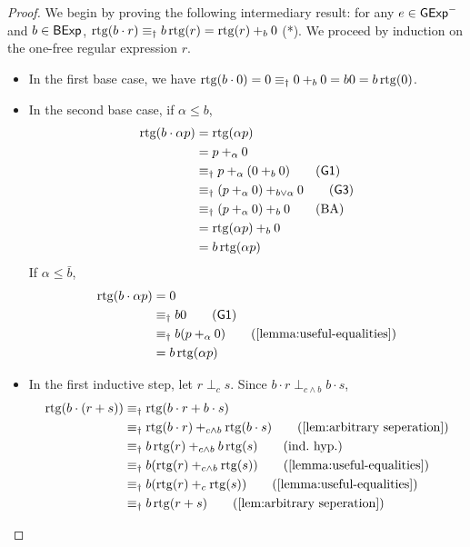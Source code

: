 \documentclass[orivec,envcountsect,envcountsame]{llncs}
\begin{document}
\begin{proof}
	We begin by proving the following intermediary result: for any \(e \in \mathsf{GExp}^-\) and \(b \in \mathsf{BExp}\), \(\operatorname{rtg}(b\cdot r) \equiv_\dagger b\operatorname{rtg}(r) = \operatorname{rtg}(r) +_b 0\) (*).
	We proceed by induction on the one-free regular expression \(r\).
	\begin{itemize}
		\item In the first base case, we have \(\operatorname{rtg}(b\cdot 0) = 0 \equiv_\dagger 0 +_b 0 = b0 = b\operatorname{rtg}(0)\).
		\item In the second base case, if \(\alpha \le b\),
		\begin{align*}
			\rtg(b\cdot \alpha p) &= \rtg(\alpha p)  \\
							&= p +_\alpha 0 \\
							&\equiv_\dagger p +_\alpha (0 +_b 0) \tag{\textsf{G1}}\\
							&\equiv_\dagger (p +_\alpha 0) +_{b \vee \alpha} 0 \tag{\textsf{G3}}\\
							&\equiv_\dagger (p +_\alpha 0) +_b 0 \tag{BA}\\
							&= \rtg(\alpha p) +_b 0 \\
							&= b\rtg(\alpha p)
		\end{align*}
		If \(\alpha \le \bar b\),
		\begin{align*}
			\rtg(b\cdot \alpha p) &= 0 \\
						&\equiv_\dagger b0 \tag{\textsf{G1}}\\
						&\equiv_\dagger b(p +_\alpha 0) \tag{\cref{lemma:useful-equalities}}\\
						&= b\rtg(\alpha p)
		\end{align*}
		\item In the first inductive step, let \(r \perp_c s\).
		Since \(b\cdot r \perp_{c\wedge b} b \cdot s\),
		\begin{align*}
			\rtg(b\cdot (r + s)) &\equiv_\dagger \rtg(b\cdot r + b\cdot s) \\
						&\equiv_\dagger \rtg(b\cdot r) +_{c\wedge b} \rtg(b\cdot s) \tag{\cref{lem:arbitrary seperation}}\\
						&\equiv_\dagger b\rtg(r) +_{c\wedge b} b\rtg(s)\tag{ind.~hyp.}\\
						&\equiv_\dagger b(\rtg(r) +_{c\wedge b} \rtg(s)) \tag{\cref{lemma:useful-equalities}}\\
						&\equiv_\dagger b(\rtg(r) +_{c} \rtg(s)) \tag{\cref{lemma:useful-equalities}}\\
						&\equiv_\dagger b\rtg(r + s) \tag{\cref{lem:arbitrary seperation}}

\end{align*}
\end{itemize}
\end{proof}
\end{document}
